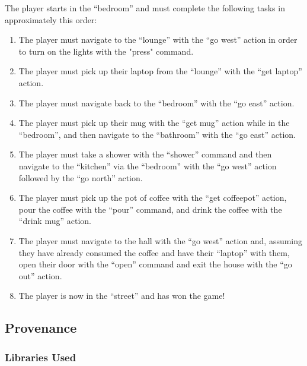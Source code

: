 \documentclass[a4paper,]{article}
\begin{document}
The player starts in the ``bedroom'' and must complete the following tasks in approximately this order:
\begin{enumerate}
    \item The player must navigate to the ``lounge'' with the ``go west'' action in order to turn on the lights with the "press" command.
    \item The player must pick up their laptop from the ``lounge'' with the ``get laptop'' action.
    \item The player must navigate back to the ``bedroom'' with the ``go east'' action.
    \item The player must pick up their mug with the ``get mug'' action while in the ``bedroom'', and then navigate to the ``bathroom'' with the ``go east'' action.
    \item The player must take a shower with the ``shower'' command and then navigate to the ``kitchen'' via the ``bedroom'' with the ``go west'' action followed by the ``go north'' action.
    \item The player must pick up the pot of coffee with the ``get coffeepot'' action, pour the coffee with the ``pour'' command, and drink the coffee with the ``drink mug'' action.
    \item The player must navigate to the hall with the ``go west'' action and, assuming they have already consumed the coffee and have their ``laptop'' with them, open their door with the ``open'' command and exit the house with the ``go out'' action.
    \item The player is now in the ``street'' and has won the game!
\end{enumerate}

\newpage

\hypertarget{provenance}{%
\subsection{Provenance}\label{provenance}}

\subsubsection{Libraries Used}\label{libraries}
\end{document}
